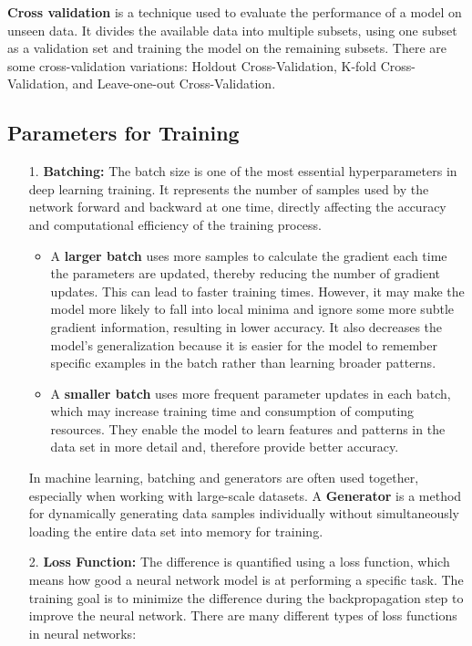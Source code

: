 \documentclass[english,version-2022-01]{uzl-thesis}
\begin{document}
\begin{enumerate}
\textbf{Cross validation} is a technique used to evaluate the performance of a model on unseen data. It divides the available data into multiple subsets, using one subset as a validation set and training the model on the remaining subsets.\cite{stone1974cross} There are some cross-validation variations: Holdout Cross-Validation, K-fold Cross-Validation, and Leave-one-out Cross-Validation.\cite{scikit-learn}
\end{enumerate}

\subsection{Parameters for Training}
\begin{itemize}
    \item[1.] \textbf{Batching:} The batch size is one of the most essential hyperparameters in deep learning training. It represents the number of samples used by the network forward and backward at one time, directly affecting the accuracy and computational efficiency of the training process. \\
    \begin{itemize}
    \item A \textbf{larger batch} uses more samples to calculate the gradient each time the parameters are updated, thereby reducing the number of gradient updates. This can lead to faster training times. However, it may make the model more likely to fall into local minima and ignore some more subtle gradient information, resulting in lower accuracy. It also decreases the model's generalization because it is easier for the model to remember specific examples in the batch rather than learning broader patterns. \\
    \item A \textbf{smaller batch} uses more frequent parameter updates in each batch, which may increase training time and consumption of computing resources. They enable the model to learn features and patterns in the data set in more detail and, therefore provide better accuracy.\cite{9355312}\\
    \end{itemize}
    \label{Generator}
    In machine learning, batching and generators are often used together, especially when working with large-scale datasets. A \textbf{Generator} is a method for dynamically generating data samples individually without simultaneously loading the entire data set into memory for training.\cite{keras}
    \item[2.] \textbf{Loss Function:} The difference is quantified using a loss function, which means how good a neural network model is at performing a specific task. The training goal is to minimize the difference during the backpropagation step to improve the neural network.\cite{LossFunctionsn} There are many different types of loss functions in neural networks:\cite{wang2020comprehensive}\\

\end{itemize}
\end{document}
